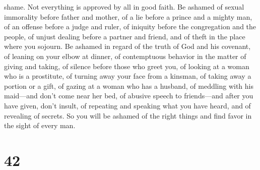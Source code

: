 shame. Not everything is approved by all in good faith. 
Be ashamed of sexual immorality before father and mother, of a lie
before a prince and a mighty man,  of an offense before a
judge and ruler, of iniquity before the congregation and the people, of
unjust dealing before a partner and friend,  and of theft
in the place where you sojourn. Be ashamed in regard of the truth of God
and his covenant, of leaning on your elbow at dinner, of contemptuous
behavior in the matter of giving and taking,  of silence
before those who greet you, of looking at a woman who is a prostitute,
 of turning away your face from a kinsman, of taking away
a portion or a gift, of gazing at a woman who has a husband,
 of meddling with his maid---and don't come near her bed,
of abusive speech to friends---and after you have given, don't insult,
 of repeating and speaking what you have heard, and of
revealing of secrets.  So you will be ashamed of the
right things and find favor in the sight of every man.

\hypertarget{section-31}{%
\section{42}\label{section-31}}

